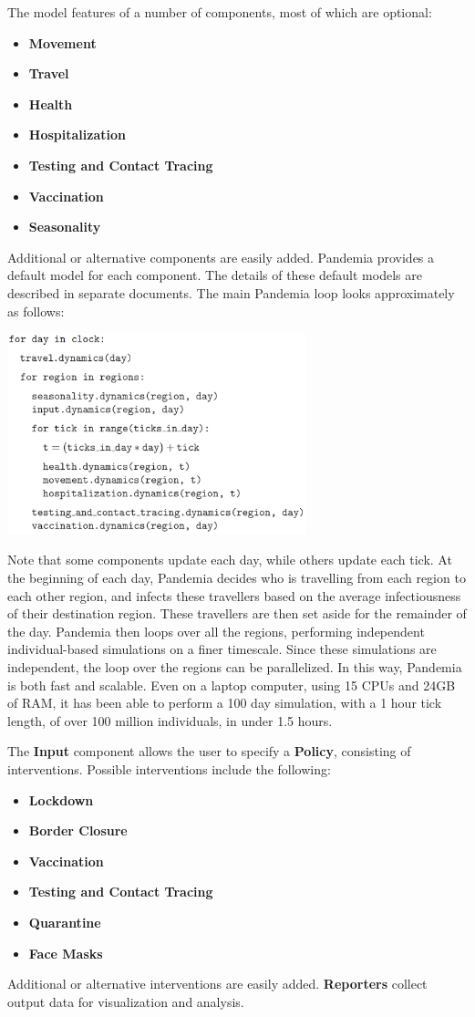 \documentclass[10pt,letterpaper]{article}
\begin{document}
The model features of a number of components, most of which are optional:
\begin{itemize}
\item \textbf{Movement}
\item \textbf{Travel}
\item \textbf{Health}
\item \textbf{Hospitalization}
\item \textbf{Testing and Contact Tracing}
\item \textbf{Vaccination}
\item \textbf{Seasonality}
\end{itemize}
Additional or alternative components are easily added. Pandemia provides a default model for each component. The details of these default models are described in separate documents. The main Pandemia loop looks approximately as follows:
\begin{center}
\includegraphics[width=0.65\textwidth]{psuedo}
\end{center}
Note that some components update each day, while others update each tick. At the beginning of each day, Pandemia decides who is travelling from each region to each other region, and infects these travellers based on the average infectiousness of their destination region. These travellers are then set aside for the remainder of the day. Pandemia then loops over all the regions, performing independent individual-based simulations on a finer timescale. Since these simulations are independent, the loop over the regions can be parallelized. In this way, Pandemia is both fast and scalable. Even on a laptop computer, using 15 CPUs and 24GB of RAM, it has been able to perform a 100 day simulation, with a 1 hour tick length, of over 100 million individuals, in under 1.5 hours.


The \textbf{Input} component allows the user to specify a \textbf{Policy}, consisting of interventions. Possible interventions include the following:
\begin{itemize}
\item \textbf{Lockdown}
\item \textbf{Border Closure}
\item \textbf{Vaccination}
\item \textbf{Testing and Contact Tracing}
\item \textbf{Quarantine}
\item \textbf{Face Masks}
\end{itemize}
Additional or alternative interventions are easily added. \textbf{Reporters} collect output data for visualization and analysis.
\end{document}
